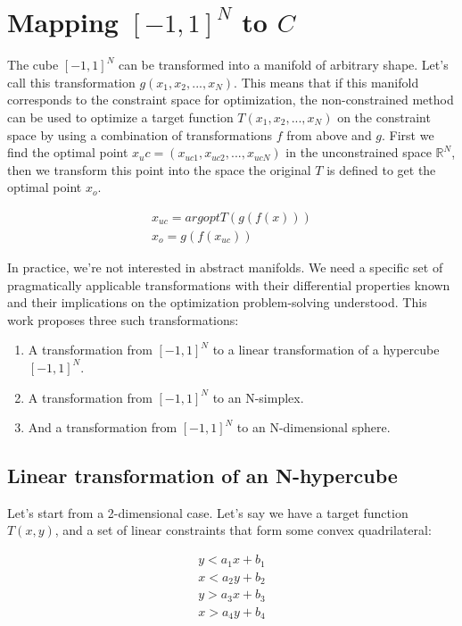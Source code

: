 \documentclass[
	a4paper, %
	10pt, %
	unnumberedsections, %
	twoside, %
]{LTJournalArticle}
\begin{document}
\section{Mapping $[-1, 1]^N$ to $C$}

The cube $[-1, 1]^N$ can be transformed into a manifold of arbitrary shape. Let's call this transformation $g(x_1, x_2, ..., x_N)$. This means that if this manifold corresponds to the constraint space for optimization, the non-constrained method can be used to optimize a target function $T(x_1, x_2, ..., x_N)$ on the constraint space by using a combination of transformations $f$ from above and $g$. First we find the optimal point $x_uc = (x_{uc1}, x_{uc2}, ..., x_{ucN})$ in the unconstrained space $\mathbb{R}^N$, then we transform this point into the space the original $T$ is defined to get the optimal point $x_o$.

\begin{equation}
	\begin{array}{cc}
	x_{uc} = argopt T(g(f(x))) \\
	x_o = g(f(x_{uc}))
	\end{array}
	\label{eq:composition}
\end{equation}

In practice, we're not interested in abstract manifolds. We need a specific set of pragmatically applicable transformations with their differential properties known and their implications on the optimization problem-solving understood. This work proposes three such transformations:
\begin{enumerate}
  \item A transformation from $[-1, 1]^N$ to a linear transformation of a hypercube $[-1, 1]^N$.
  \item A transformation from $[-1, 1]^N$ to an N-simplex.
  \item And a transformation from $[-1, 1]^N$ to an N-dimensional sphere. 
\end{enumerate}

\subsection{Linear transformation of an N-hypercube}

Let's start from a 2-dimensional case. Let's say we have a target function $T(x, y)$, and a set of linear constraints that form some convex quadrilateral:

\begin{equation}
	\begin{array}{cc}
	y < a_1x+b_1 \\
	x < a_2y+b_2 \\
	y > a_3x+b_3 \\
	x > a_4y+b_4
	\end{array}
	\label{eq:linear_constraints}
\end{equation}
\end{document}
